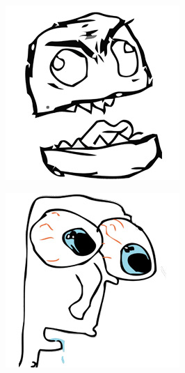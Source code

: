 \begin{multicols}{8}
\begin{center}
\includegraphics[width=\linewidth]{./IMG-GIT/MEMES/Meme-Faces-35.jpg}  
\end{center}

\begin{center}
\includegraphics[width=\linewidth]{./IMG-GIT/MEMES/Meme-Faces-44.jpg}  
\end{center}


\end{multicols}
